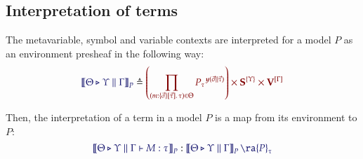 \documentclass[11pt]{article}
\theoremstyle{definition}
\theoremstyle{remark}
\numberwithin{equation}{section}
\begin{document}
\subsection{Interpretation of terms}

The metavariable, symbol and variable contexts are interpreted for a model $P$ as
an environment presheaf in the following way:
\[
  \Define{
    \SemBrackets{
      \Theta\triangleright\Upsilon\parallel\Gamma
    }_P
  }{
    \left(
      \prod_{
        (m:%
        \MkValence
          {\vec{\sigma}}
          {\vec{\tau}}
          {\tau})
        \in\Theta
      }{{P_{\tau}}^{\Yoneda{\vec{\sigma}\parallel\vec{\tau}}}}
    \right)
    \times
    \SymPsh^{\{\Upsilon\}}
    \times
    \VarPsh^{[\Gamma]}
  }
\]

Then, the interpretation of a term in a model $P$ is a map from its environment
to $P$:
\[
  \Of{
    \SemBrackets{
      \Theta\triangleright\Upsilon\parallel\Gamma\vdash M:\tau
    }_{P}
  }{
    \SemBrackets{
      \Theta\triangleright\Upsilon\parallel\Gamma
    }_{P}\ra {P}_{\tau}
  }
\]
\end{document}
